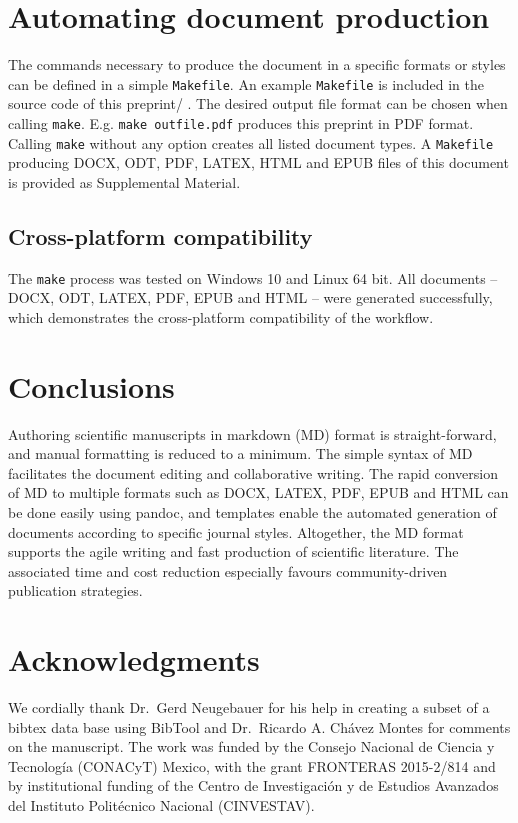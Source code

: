 \documentclass[10pt,fleqn]{wlpeerj}
\begin{document}
\section{Automating
document
production}\label{automating-document-production}

The
commands
necessary
to
produce
the
document
in a
specific
formats
or
styles
can
be
defined
in a
simple
\texttt{Makefile}.
An
example
\texttt{Makefile}
is
included
in
the
source
code
of
this
preprint/
. The
desired
output
file
format
can
be
chosen
when
calling
\texttt{make}.
E.g.
\texttt{make\ outfile.pdf}
produces
this
preprint
in
PDF
format.
Calling
\texttt{make}
without
any
option
creates
all
listed
document
types.
A
\texttt{Makefile}
producing
DOCX,
ODT,
PDF,
LATEX,
HTML
and
EPUB
files
of
this
document
is
provided
as
Supplemental
Material.

\subsection{Cross-platform
compatibility}\label{cross-platform-compatibility}

The
\texttt{make}
process
was
tested
on
Windows
10
and
Linux
64
bit.
All
documents
--
DOCX,
ODT,
LATEX,
PDF,
EPUB
and
HTML
--
were
generated
successfully,
which
demonstrates
the
cross-platform
compatibility
of
the
workflow.

\section{Conclusions}\label{conclusions}

Authoring
scientific
manuscripts
in
markdown
(MD)
format
is
straight-forward,
and
manual
formatting
is
reduced
to a
minimum.
The
simple
syntax
of MD
facilitates
the
document
editing
and
collaborative
writing.
The
rapid
conversion
of MD
to
multiple
formats
such
as
DOCX,
LATEX,
PDF,
EPUB
and
HTML
can
be
done
easily
using
pandoc,
and
templates
enable
the
automated
generation
of
documents
according
to
specific
journal
styles.
Altogether,
the
MD
format
supports
the
agile
writing
and
fast
production
of
scientific
literature.
The
associated
time
and
cost
reduction
especially
favours
community-driven
publication
strategies.

\section{Acknowledgments}\label{acknowledgments}

We
cordially
thank
Dr.~Gerd
Neugebauer
for
his
help
in
creating
a
subset
of a
bibtex
data
base
using
BibTool
and
Dr.~Ricardo
A.
Chávez
Montes
for
comments
on
the
manuscript.
The
work
was
funded
by
the
Consejo
Nacional
de
Ciencia
y
Tecnología
(CONACyT)
Mexico,
with
the
grant
FRONTERAS
2015-2/814
and
by
institutional
funding
of
the
Centro
de
Investigación
y de
Estudios
Avanzados
del
Instituto
Politécnico
Nacional
(CINVESTAV).
\end{document}
